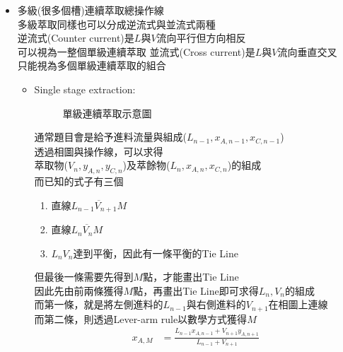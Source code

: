 \documentclass[../main.tex]{subfiles}
\begin{document}
\begin{itemize}
  \item 多級(很多個槽)連續萃取總操作線\\
  多級萃取同樣也可以分成逆流式與並流式兩種\\
  逆流式(Counter current)是$L$與$V$流向平行但方向相反\\
  可以視為一整個單級連續萃取
  並流式(Cross current)是$L$與$V$流向垂直交叉\\
  只能視為多個單級連續萃取的組合
  \begin{itemize}
    \item Single stage extraction:
    \begin{figure}[H]
    \centering
    \caption{單級連續萃取示意圖}
  \end{figure}
    通常題目會是給予進料流量與組成($L_{n-1},x_{A,n-1},x_{C,n-1}$)\\
    透過相圖與操作線，可以求得\\
    萃取物($V_n,y_{A,n},y_{C,n}$)及萃餘物($L_n,x_{A,n},x_{C,n}$)的組成\\
    而已知的式子有三個
    \begin{enumerate}
      \item 直線$\overline{L_{n-1}V_{n+1}M}$
      \item 直線$\overline{L_{n}V_{n}M}$
      \item $L_nV_n$達到平衡，因此有一條平衡的Tie Line
    \end{enumerate}
    但最後一條需要先得到$M$點，才能畫出Tie Line\\
    因此先由前兩條獲得$M$點，再畫出Tie Line即可求得$L_n,V_n$的組成\\
    而第一條，就是將左側進料的$L_{n-1}$與右側進料的$V_{n+1}$在相圖上連線\\
    而第二條，則透過Lever-arm rule以數學方式獲得$M$
    \begin{align}
      x_{A,M} &= \frac{L_{n-1}x_{A,n-1}+V_{n+1}y_{A,n+1}}{L_{n-1}+V_{n+1}}\\

\end{align}
\end{itemize}
\end{itemize}
\end{document}
